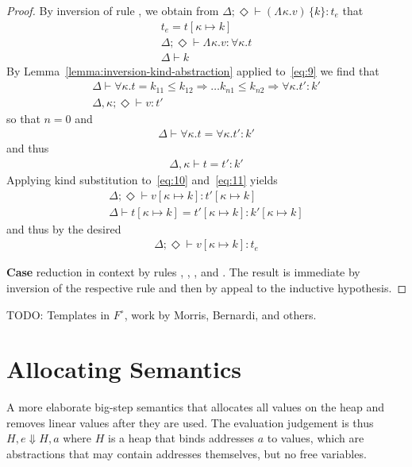 \documentclass{article}
\newcommand{\Addr}{a}
\newcommand{\KVAR}{\kappa}
\newcommand{\ONE}{\circ}
\newcommand{\KALL}[1]{\forall#1.}
\newcommand{\KLAM}[2][{}]{\Lambda^{#1}#2.}
\newcommand{\KAPP}[2]{#1\,\{#2\}}
\newcommand{\KENV}{\Delta}
\newcommand{\TENVEMPTY}{\Diamond}
\begin{document}
\begin{proof}
  By inversion of rule , we obtain from
  $\KENV; \TENVEMPTY \vdash \KAPP{(\KLAM \KVAR v)}k : t_e$ that
  \begin{gather}
    t_e =  t[\KVAR \mapsto k] \\
    \label{eq:9}
    \KENV; \TENVEMPTY \vdash \KLAM \KVAR v : \KALL\KVAR t \\
    \KENV \vdash k
  \end{gather}
  By Lemma~\ref{lemma:inversion-kind-abstraction} applied to~\eqref{eq:9} we find that
  \begin{gather}
    \KENV \vdash
    \KALL\KVAR t
    = k_{11}\le k_{12}\Rightarrow \dots k_{n1}\le k_{n2} \Rightarrow
    \KALL \KVAR t' : k'     \\
    \label{eq:10}
    \KENV, \KVAR; \TENVEMPTY \vdash v : t'
  \end{gather}
  so that $n=0$ and
  \begin{gather}
    \KENV \vdash
    \KALL\KVAR t
    = 
    \KALL \KVAR t' : k'
  \end{gather}
  and thus
  \begin{gather}\label{eq:11}
    \KENV, \KVAR \vdash
    t
    = 
    t' : k'
  \end{gather}
  Applying kind substitution to~\eqref{eq:10} and~\eqref{eq:11} yields
  \begin{gather}
    \KENV; \TENVEMPTY \vdash v[\KVAR \mapsto k] : t'[\KVAR \mapsto k]
    \\
    \KENV \vdash
    t[\KVAR \mapsto k]
    = 
    t'[\KVAR \mapsto k] : k'[\KVAR \mapsto k]
  \end{gather}
  and thus by  the desired
  \begin{gather}
    \KENV; \TENVEMPTY \vdash v[\KVAR \mapsto k] : t_e
  \end{gather}

  \textbf{Case} reduction in context by rules ,
  , , and . The result is
  immediate by inversion of the respective rule and then by appeal to the inductive hypothesis.
\end{proof}

TODO: 
Templates in $F^{\ONE}$, work by Morris, Bernardi, and others.

\section{Allocating Semantics}

A more elaborate big-step semantics that allocates all values on the
heap and removes linear values after they are used.  The evaluation
judgement is thus $H, e \Downarrow H, \Addr$ where $H$ is a heap that
binds addresses $\Addr$ to values, which are abstractions that may
contain addresses themselves, but no free variables.
\end{document}
